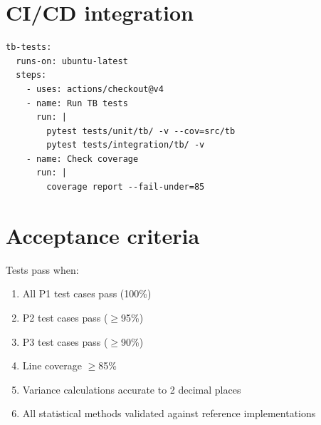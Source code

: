 \section{CI/CD integration}

\begin{lstlisting}[basicstyle=\ttfamily\small,caption={GitHub Actions workflow excerpt.}]
tb-tests:
  runs-on: ubuntu-latest
  steps:
    - uses: actions/checkout@v4
    - name: Run TB tests
      run: |
        pytest tests/unit/tb/ -v --cov=src/tb
        pytest tests/integration/tb/ -v
    - name: Check coverage
      run: |
        coverage report --fail-under=85
\end{lstlisting}

\section{Acceptance criteria}

Tests pass when:
\begin{enumerate}
  \item All P1 test cases pass (100\%)
  \item P2 test cases pass ($\geq$95\%)
  \item P3 test cases pass ($\geq$90\%)
  \item Line coverage $\geq$85\%
  \item Variance calculations accurate to 2 decimal places
  \item All statistical methods validated against reference implementations
\end{enumerate}